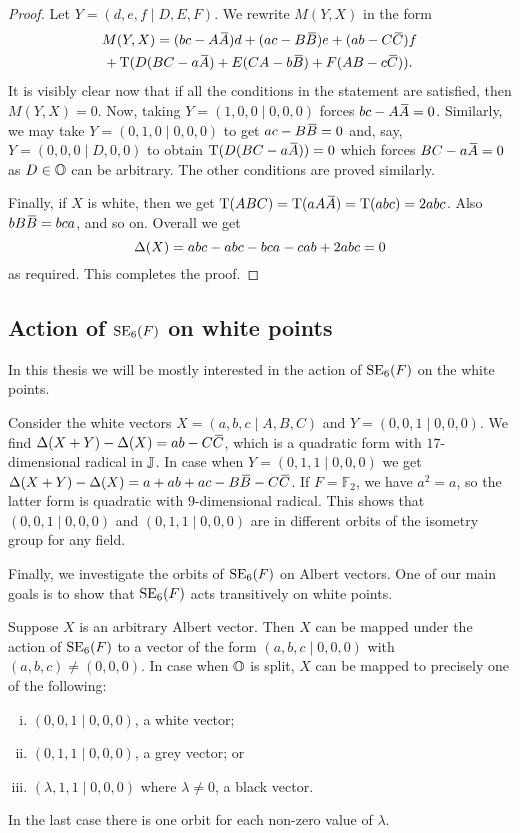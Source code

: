\begin{proof}
	Let $Y = (d,e,f\mid D,E,F)$. We rewrite $M(Y,X)$ in the form
	\begin{multline*}
		M(Y,X) = (bc - A \ovA)d + (ac - B \ovB) e + (ab - C \ovC) f \\
			+ \Tr(D(BC-a\ovA) + E(CA - b\ovB) + F(AB - c\ovC)).
	\end{multline*}
It is visibly clear now that if all the conditions in the statement are satisfied,
then $M(Y,X) = 0$. Now, taking $Y = (1,0,0\mid 0,0,0)$ forces
$bc-A\mathord{\mbox{\hspace*{0pt}}\,\overline{\!A\!\!\;}\!\:}\mbox{\hspace*{0pt}} = 0$. Similarly, we may take $Y = (0,1,0\mid 0,0,0)$ to get 
$ac - B\mathord{\mbox{\hspace*{0pt}}\,\overline{\!B\!\!\;}\!\:}\mbox{\hspace*{0pt}} = 0$ and, say, $Y = (0,0,0\mid D,0,0)$ to obtain
$\operatorname{T}(D(BC - a\mathord{\mbox{\hspace*{0pt}}\,\overline{\!A\!\!\;}\!\:}\mbox{\hspace*{0pt}})) = 0$ which forces $BC - a\mathord{\mbox{\hspace*{0pt}}\,\overline{\!A\!\!\;}\!\:}\mbox{\hspace*{0pt}} = 0$ as $D \in \mathbb{O}$ can
be arbitrary. The other conditions are proved similarly.

Finally, if $X$ is white, then we get $\operatorname{T}(ABC) = \operatorname{T}(a A\mathord{\mbox{\hspace*{0pt}}\,\overline{\!A\!\!\;}\!\:}\mbox{\hspace*{0pt}}) = \operatorname{T}(abc) = 2abc$. 
Also $b B\mathord{\mbox{\hspace*{0pt}}\,\overline{\!B\!\!\;}\!\:}\mbox{\hspace*{0pt}} = bca$, and so on. Overall we get 
\begin{equation*}
	\Delta(X) = abc - abc - bca - cab + 2abc = 0
\end{equation*}
as required. This completes the proof.
\end{proof}

\subsection{Action of $\mathrm{SE}_6(F)$ on white points}

In this thesis we will be mostly interested in the action of $\mathrm{SE}_6(F)$ on the 
white points. 

Consider the white vectors $X = (a,b,c\mid A,B,C)$ and $Y = (0,0,1\mid 0,0,0)$. We find 
\mbox{$\Delta(X+Y) - \Delta(X) = ab - C\mathord{\mbox{\hspace*{0pt}}\,\overline{\!C\!\!\;}\!\:}\mbox{\hspace*{0pt}}$}, which is a quadratic form with 
\mbox{$17$-dimensional} radical in $\mathbb{J}$. In case when $Y = (0,1,1\mid 0,0,0)$ we get
$\Delta(X+Y) - \Delta(X) = a+ab+ac-B\ovB-C\ovC$. If $F = \mathbb{F}_2$, 
we have $a^2 = a$, so the latter form is quadratic with $9$-dimensional radical. This
shows that $(0,0,1\mid 0,0,0)$ and $(0,1,1\mid 0,0,0)$ are in different orbits 
of the isometry group for any field.

Finally, we investigate the orbits of $\mathrm{SE}_6(F)$ on Albert vectors. One of our main
goals is to show that $\mathrm{SE}_6(F)$ acts transitively on white points. 

\begin{lemma}
	Suppose $X$ is an arbitrary Albert vector. Then $X$ can be mapped under the action
	of $\mathrm{SE}_6(F)$ to a vector of the form $(a,b,c\mid 0,0,0)$ with $(a,b,c) \neq 
	(0,0,0)$. In case when $\mathbb{O}$ is split, $X$ can be mapped to precisely one of the
	 following:
	\begin{enumerate}[(i)]
		\item $(0,0,1\mid 0,0,0)$, a white vector;
		\item $(0,1,1\mid 0,0,0)$, a grey vector; or
		\item $(\lambda,1,1\mid 0,0,0)$ where $\lambda \neq 0$, a black vector.
	\end{enumerate}
	In the last case there is one orbit for each non-zero value of $\lambda$. 
\end{lemma}

